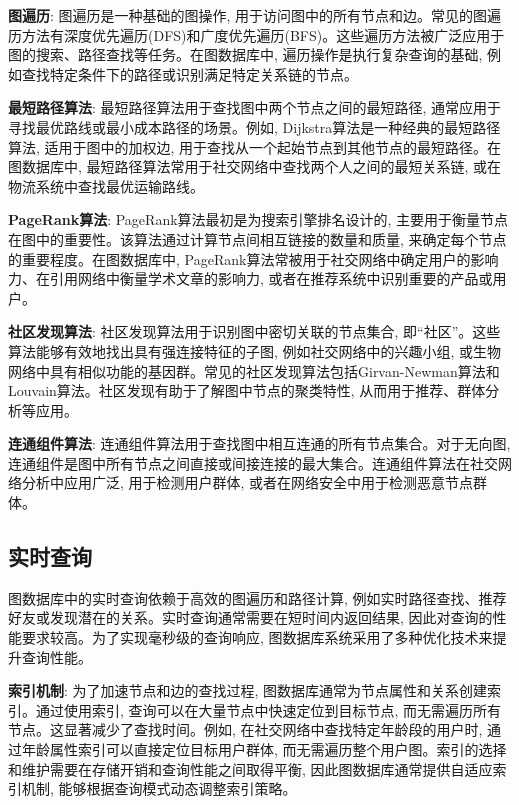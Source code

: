 \textbf{图遍历}: 图遍历是一种基础的图操作, 用于访问图中的所有节点和边。常见的图遍历方法有深度优先遍历(DFS)和广度优先遍历(BFS)。这些遍历方法被广泛应用于图的搜索、路径查找等任务。在图数据库中, 遍历操作是执行复杂查询的基础, 例如查找特定条件下的路径或识别满足特定关系链的节点。

\textbf{最短路径算法}: 最短路径算法用于查找图中两个节点之间的最短路径, 通常应用于寻找最优路线或最小成本路径的场景。例如, Dijkstra算法是一种经典的最短路径算法, 适用于图中的加权边, 用于查找从一个起始节点到其他节点的最短路径。在图数据库中, 最短路径算法常用于社交网络中查找两个人之间的最短关系链, 或在物流系统中查找最优运输路线。

\textbf{PageRank算法}: PageRank算法最初是为搜索引擎排名设计的, 主要用于衡量节点在图中的重要性。该算法通过计算节点间相互链接的数量和质量, 来确定每个节点的重要程度。在图数据库中, PageRank算法常被用于社交网络中确定用户的影响力、在引用网络中衡量学术文章的影响力, 或者在推荐系统中识别重要的产品或用户。

\textbf{社区发现算法}: 社区发现算法用于识别图中密切关联的节点集合, 即“社区”。这些算法能够有效地找出具有强连接特征的子图, 例如社交网络中的兴趣小组, 或生物网络中具有相似功能的基因群。常见的社区发现算法包括Girvan-Newman算法和Louvain算法。社区发现有助于了解图中节点的聚类特性, 从而用于推荐、群体分析等应用。

\textbf{连通组件算法}: 连通组件算法用于查找图中相互连通的所有节点集合。对于无向图, 连通组件是图中所有节点之间直接或间接连接的最大集合。连通组件算法在社交网络分析中应用广泛, 用于检测用户群体, 或者在网络安全中用于检测恶意节点群体。



\subsection{实时查询}

图数据库中的实时查询依赖于高效的图遍历和路径计算, 例如实时路径查找、推荐好友或发现潜在的关系。实时查询通常需要在短时间内返回结果, 因此对查询的性能要求较高。为了实现毫秒级的查询响应, 图数据库系统采用了多种优化技术来提升查询性能。

\textbf{索引机制}: 为了加速节点和边的查找过程, 图数据库通常为节点属性和关系创建索引。通过使用索引, 查询可以在大量节点中快速定位到目标节点, 而无需遍历所有节点。这显著减少了查找时间。例如, 在社交网络中查找特定年龄段的用户时, 通过年龄属性索引可以直接定位目标用户群体, 而无需遍历整个用户图。索引的选择和维护需要在存储开销和查询性能之间取得平衡, 因此图数据库通常提供自适应索引机制, 能够根据查询模式动态调整索引策略。

